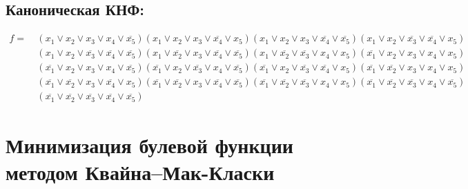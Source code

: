 \documentclass{article}
\begin{document}
\subsection*{Каноническая КНФ:}
\begin{align*}
f =\: &\left(x_{1} \lor x_{2} \lor x_{3} \lor x_{4} \lor \overline{x_{5}}\right)\left(x_{1} \lor x_{2} \lor x_{3} \lor \overline{x_{4}} \lor x_{5}\right)\left(x_{1} \lor x_{2} \lor x_{3} \lor \overline{x_{4}} \lor \overline{x_{5}}\right)\left(x_{1} \lor x_{2} \lor \overline{x_{3}} \lor \overline{x_{4}} \lor x_{5}\right)\\&\left(x_{1} \lor x_{2} \lor \overline{x_{3}} \lor \overline{x_{4}} \lor \overline{x_{5}}\right)\left(x_{1} \lor \overline{x_{2}} \lor x_{3} \lor \overline{x_{4}} \lor \overline{x_{5}}\right)\left(x_{1} \lor \overline{x_{2}} \lor \overline{x_{3}} \lor x_{4} \lor x_{5}\right)\left(\overline{x_{1}} \lor x_{2} \lor x_{3} \lor x_{4} \lor x_{5}\right)\\&\left(\overline{x_{1}} \lor x_{2} \lor x_{3} \lor x_{4} \lor \overline{x_{5}}\right)\left(\overline{x_{1}} \lor x_{2} \lor \overline{x_{3}} \lor x_{4} \lor \overline{x_{5}}\right)\left(\overline{x_{1}} \lor x_{2} \lor \overline{x_{3}} \lor \overline{x_{4}} \lor x_{5}\right)\left(\overline{x_{1}} \lor \overline{x_{2}} \lor x_{3} \lor x_{4} \lor x_{5}\right)\\&\left(\overline{x_{1}} \lor \overline{x_{2}} \lor x_{3} \lor \overline{x_{4}} \lor x_{5}\right)\left(\overline{x_{1}} \lor \overline{x_{2}} \lor x_{3} \lor \overline{x_{4}} \lor \overline{x_{5}}\right)\left(\overline{x_{1}} \lor \overline{x_{2}} \lor \overline{x_{3}} \lor x_{4} \lor x_{5}\right)\left(\overline{x_{1}} \lor \overline{x_{2}} \lor \overline{x_{3}} \lor x_{4} \lor \overline{x_{5}}\right)\\&\left(\overline{x_{1}} \lor \overline{x_{2}} \lor \overline{x_{3}} \lor \overline{x_{4}} \lor \overline{x_{5}}\right)\end{align*}
\section*{Минимизация булевой функции методом Квайна--Мак-Класки}
\end{document}
